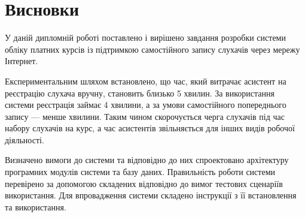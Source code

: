 \newpage
\section*{Висновки}
\bigskip
У даній дипломній роботі поставлено і вирішено завдання розробки системи обліку платних курсів із підтримкою самостійного запису слухачів через мережу Інтернет.

Експериментальним шляхом встановлено, що час, який витрачає асистент на реєстрацію слухача вручну, становить близько 5 хвилин. За використання системи реєстрація займає 4 хвилини, а за умови самостійного попереднього запису --- менше хвилини. Таким чином скорочується черга слухачів під час набору слухачів на курс, а час асистентів звільняється для інших видів робочої діяльності.

Визначено вимоги до системи та відповідно до них спроектовано архітектуру програмних модулів системи та базу даних. Правильність роботи системи перевірено за допомогою складених відповідно до вимог тестових сценаріїв використання. Для впровадження системи складено інструкції з її встановлення та використання.
